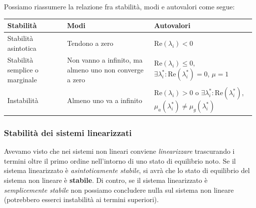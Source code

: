 \documentclass[a4paper,11pt]{article}
\begin{document}
Possiamo riassumere la relazione fra stabilità, modi e autovalori come segue:
\begin{table}[H]
	\center {}
	\begin{tabular} { p{3.5cm} | p{5cm} | p{5cm} }
		\bfseries Stabilità & \bfseries Modi & \bfseries Autovalori \\
		\hline
		Stabilità asintotica & Tendono a zero & $\mathrm{Re}(\lambda_i) < 0$ \\
	Stabilità semplice o marginale & Non vanno a infinito, ma almeno uno non converge a zero & $\mathrm{Re}(\lambda_i) \leq 0$, $\exists \lambda_i^* : \mathrm{Re}(\lambda_i^*) = 0$, $\mu = 1$ \\
Instabilità & Almeno uno va a infinito & $\mathrm{Re}(\lambda_i) > 0$ o $\exists \lambda_i^* : \mathrm{Re}(\lambda_i^*)$, $\mu_a(\lambda_i^*) \neq \mu_g(\lambda_i^*)$ \\
	\end{tabular}
\end{table}

\subsubsection{Stabilità dei sistemi linearizzati}
Avevamo visto che nei sistemi non lineari conviene \textit{linearizzare} trascurando i termini oltre il primo ordine nell'intorno di uno stato di equilibrio noto.
Se il sistema linearizzato è \textit{asintoticamente stabile}, si avrà che lo stato di equilibrio del sistema non lineare è \textbf{stabile}.
Di contro, se il sistema linearizzato è \textit{semplicemente stabile} non possiamo concludere nulla sul sistema non lineare (potrebbero esserci instabilità ai termini superiori).
\end{document}
